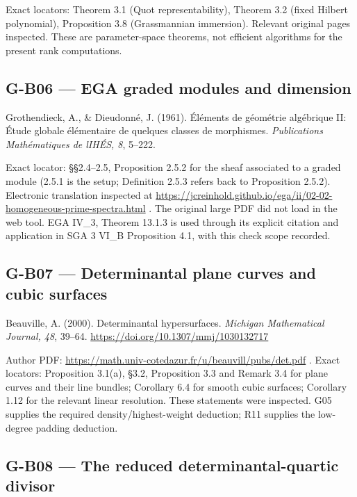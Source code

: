 \documentclass[11pt,a4paper]{article}
\theoremstyle{definition}\newtheorem{definition}{Definition}
\begin{document}
Exact locators: Theorem 3.1 (Quot representability), Theorem 3.2 (fixed
Hilbert polynomial), Proposition 3.8 (Grassmannian immersion). Relevant
original pages inspected. These are parameter-space theorems, not
efficient algorithms for the present rank computations.

\subsection{G-B06 --- EGA graded modules and
dimension}\label{g-b06--ega-graded-modules-and-dimension}

Grothendieck, A., \& Dieudonné, J. (1961). Éléments de géométrie
algébrique II: Étude globale élémentaire de quelques classes de
morphismes. \emph{Publications Mathématiques de l\textquotesingle IHÉS,
8}, 5--222.

Exact locator: §§2.4--2.5, Proposition 2.5.2 for the sheaf associated to
a graded module (2.5.1 is the setup; Definition 2.5.3 refers back to
Proposition 2.5.2). Electronic translation inspected at
\url{https://jcreinhold.github.io/ega/ii/02-02-homogeneous-prime-spectra.html}
. The original large PDF did not load in the web tool. EGA IV\_3,
Theorem 13.1.3 is used through its explicit citation and application in
SGA 3 VI\_B Proposition 4.1, with this check scope recorded.

\subsection{G-B07 --- Determinantal plane curves and cubic
surfaces}\label{g-b07--determinantal-plane-curves-and-cubic-surfaces}

Beauville, A. (2000). Determinantal hypersurfaces. \emph{Michigan
Mathematical Journal, 48}, 39--64.
\url{https://doi.org/10.1307/mmj/1030132717}

Author PDF: \url{https://math.univ-cotedazur.fr/u/beauvill/pubs/det.pdf}
. Exact locators: Proposition 3.1(a), §3.2, Proposition 3.3 and Remark
3.4 for plane curves and their line bundles; Corollary 6.4 for smooth
cubic surfaces; Corollary 1.12 for the relevant linear resolution. These
statements were inspected. G05 supplies the required
density/highest-weight deduction; R11 supplies the low-degree padding
deduction.

\subsection{G-B08 --- The reduced determinantal-quartic
divisor}\label{g-b08--the-reduced-determinantal-quartic-divisor}
\end{document}
